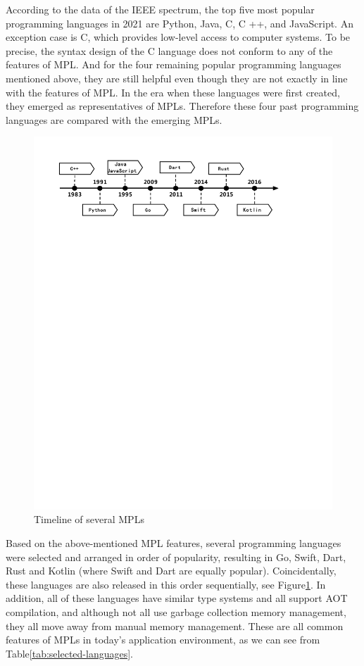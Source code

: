 According to the data of the IEEE spectrum\cite{IEEETopProgrammingLanguages},
the top five most popular programming languages in 2021 are Python, Java, C, C ++, and JavaScript. An exception case is C, which provides low-level access to computer systems. To be precise, the syntax design of the C language does not conform to any of the features of MPL. And for the four remaining popular programming languages mentioned above, they are still helpful even though they are not exactly in line with the features of MPL. In the era when these languages were first created, they emerged as representatives of MPLs. Therefore these four past programming languages are compared with the emerging MPLs.

\begin{figure}[htbp]
    \centerline{\includegraphics[scale=0.6]{figures/timeline}}
    \caption{Timeline of several MPLs}
    \label{fig:timeline}
\end{figure}


Based on the above-mentioned MPL features,
several programming languages were selected and arranged
in order of popularity\cite{IEEETopProgrammingLanguages},
resulting in Go, Swift, Dart, Rust and Kotlin (where Swift and Dart are equally popular).
Coincidentally, these languages are also released in this order sequentially, see Figure\ref{fig:timeline}.
In addition, all of these languages have similar type systems and all support AOT compilation, and although not all use garbage collection memory management, they all move away from manual memory management.
These are all common features of MPLs in today's application environment, as we can see from Table\ref{tab:selected-languages}.

